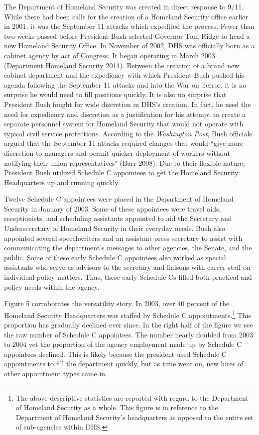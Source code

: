 \documentclass[12pt]{article}
\begin{document}
The Department of Homeland Security was created in direct response to 9/11. While there had been calls for the creation of a Homeland Security office earlier in 2001, it was the September 11 attacks which expedited the process. Fewer than two weeks passed before President Bush selected Governor Tom Ridge to head a new Homeland Security Office. In November of 2002, DHS was officially born as a cabinet agency by act of Congress. It began operating in March 2003 (Department Homeland Security 2014). Between the creation of a brand new cabinet department and the expediency with which President Bush pushed his agenda following the September 11 attacks and into the War on Terror, it is no surprise he would need to fill positions quickly. It is also no surprise that President Bush fought for wide discretion in DHS's creation. In fact, he used the need for expediency and discretion as a justification for his attempt to create a separate personnel system for Homeland Security that would not operate with typical civil service protections. According to the \textit{Washington Post}, Bush officials argued that the September 11 attacks required changes that would ``give more discretion to managers and permit quicker deployment of workers without notifying their union representatives" (Barr 2008). Due to their flexible nature, President Bush utilized Schedule C appointees to get the Homeland Security Headquarters up and running quickly.

Twelve Schedule C appointees were placed in the Department of Homeland Security in January of 2003. Some of these appointees were travel aids, receptionists, and scheduling assistants appointed to aid the Secretary and Undersecretary of Homeland Security in their everyday needs. Bush also appointed several speechwriters and an assistant press secretary to assist with communicating the department's messages to other agencies, the Senate, and the public. Some of these early Schedule C appointees also worked as special assistants who serve as advisors to the secretary and liaisons with career staff on individual policy matters. Thus, these early Schedule Cs filled both practical and policy needs within the agency.

Figure 5 corroborates the versatility story. In 2003, over 40 percent of the Homeland Security Headquarters was staffed by Schedule C appointments.\footnote{The above descriptive statistics are reported with regard to the Department of Homeland Security as a whole. This figure is in reference to the Department of Homeland Security's headquarters as opposed to the entire set of sub-agencies within DHS.} This proportion has gradually declined ever since. In the right half of the figure we see the raw number of Schedule C appointees. The number nearly doubled from 2003 to 2004 yet the proportion of the agency employment made up by Schedule C appointees declined. This is likely because the president used Schedule C appointments to fill the department quickly, but as time went on, new hires of other appointment types came in.
\end{document}
